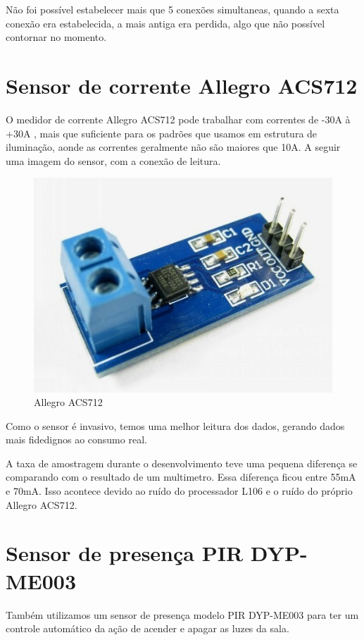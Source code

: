 \documentclass[openright]{normas-utf-tex} %
\begin{document}
Não foi possível estabelecer mais que 5 conexões simultaneas, quando a sexta conexão era estabelecida, a mais antiga era perdida, algo que não possível contornar no momento.

\section{Sensor de corrente Allegro ACS712}
O medidor de corrente Allegro ACS712  \cite{Allegro} pode trabalhar com correntes de -30A à +30A   \cite{Allegro} , mais que suficiente para os padrões que usamos em estrutura de iluminação, aonde as correntes geralmente não são maiores que 10A. A seguir uma imagem do sensor, com a conexão de leitura.

\begin{figure}[!htb]
     \centering
     \includegraphics[scale=0.6]{AllegroACS712.jpg}
     \caption{Allegro ACS712}
     \label{fig:AllegreoACS712}
\end{figure}

Como o sensor é invasivo, temos uma melhor leitura dos dados, gerando dados mais fidedignos ao consumo real.

A taxa de amostragem durante o desenvolvimento teve uma pequena diferença se comparando com o resultado de um multimetro. Essa diferença ficou entre 55mA e 70mA. Isso acontece devido ao ruído do processador L106 e o ruído do próprio Allegro ACS712.

\section{Sensor de presença PIR DYP-ME003}

Também utilizamos um sensor de presença modelo PIR DYP-ME003   \cite{openimpulse}
para ter um controle automático da ação de acender e apagar as luzes da sala.
\end{document}
